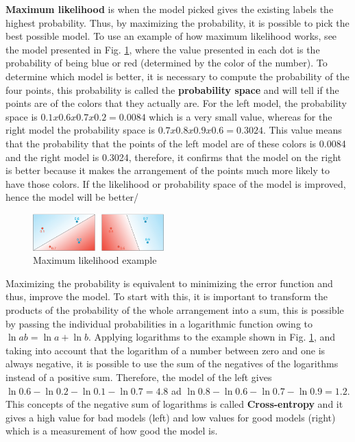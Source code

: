 \documentclass{article}
\begin{document}
\textbf{Maximum likelihood} is when the model picked gives the existing labels the highest probability. Thus, by maximizing the probability, it is possible to pick the best possible model. To use an example of how maximum likelihood works, see the model presented in Fig. \ref{fig:f22}, where the value presented in each dot is the probability of being blue or red (determined by the color of the number). To determine which model is better, it is necessary to compute the probability of the four points, this probability is called the \textbf{probability space} and will tell if the points are of the colors that they actually are. For the left model, the probability space is \(0.1 x 0.6 x 0.7 x 0.2 = 0.0084\) which is a very small value, whereas for the right model the probability space is \(0.7 x 0.8 x 0.9 x 0.6 = 0.3024\). This value means that the probability that the points of the left model are of these colors is 0.0084 and the right model is 0.3024, therefore, it confirms that the model on the right is better because it makes the arrangement of the points much more likely to have those colors. If the likelihood or probability space of the model is improved, hence the model will be better/

\begin{figure}[ht]
    \centering
    \includegraphics[width=0.45\textwidth,height=0.45\textheight,keepaspectratio]{images/likelihood.png}
    \captionsetup{justification=centering}
    \caption{Maximum likelihood example}
    \label{fig:f22}
\end{figure}

Maximizing the probability is equivalent to minimizing the error function and thus, improve the model. To start with this, it is important to transform the products of the probability of the whole arrangement into a sum, this is possible by passing the individual probabilities in a logarithmic function owing to \(\ln{ab} = \ln{a} + \ln{b}\). Applying logarithms to the example shown in Fig. \ref{fig:f22}, and taking into account that the logarithm of a number between zero and one is always negative, it is possible to use the sum of the negatives of the logarithms instead of a positive sum. Therefore, the model of the left gives \(\ln{0.6} - \ln{0.2} - \ln{0.1} - \ln{0.7} = 4.8\) ad \(\ln{0.8} - \ln{0.6} - \ln{0.7} - \ln{0.9} = 1.2\). This concepts of the negative sum of logarithms is called \textbf{Cross-entropy} and it gives a high value for bad models (left) and low values for good models (right) which is a measurement of how good the model is. 
\end{document}
